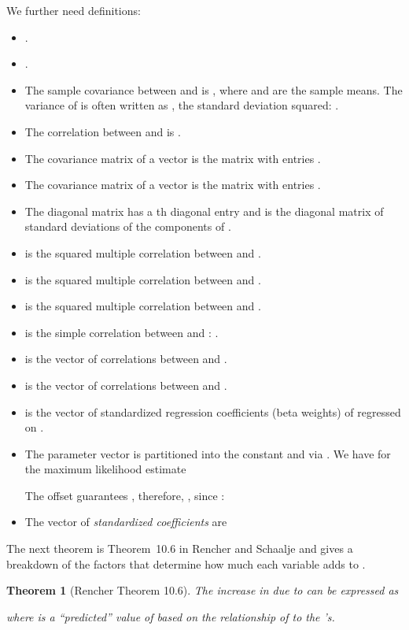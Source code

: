 \documentclass{article}
\newtheorem{theorem}{Theorem}
\begin{document}
\begin{appendices}
We further need definitions: 
\begin{itemize}
\item .
\item .
\item The sample covariance between  and 
  is , where
   and  are the sample means. The variance of  is  often
  written as , the standard deviation squared: .
\item The correlation between  and  is .
\item The covariance matrix  of a vector  is the matrix
  with entries .
\item The covariance matrix  of a vector  is the matrix
  with entries .
\item The diagonal matrix 
  has a th diagonal entry
   and is the diagonal matrix of standard deviations of the components
  of .
\item  is the squared multiple correlation between  and .
\item  is the squared multiple correlation between  and .
\item   is
  the squared multiple correlation between  and .
\item  is the simple correlation between  and : .
\item  is
  the vector of correlations between  and .
\item  is
  the vector of correlations between  and .
\item  is
  the vector of standardized regression coefficients (beta weights)
of  regressed on .
\item The parameter vector is partitioned into the constant 
  and  via
  .
  We have for the maximum likelihood estimate
 
 The offset  guarantees ,
 therefore, ,
 since :
 

 
\item The vector of {\em standardized coefficients}  are
 
\end{itemize}


The next theorem is Theorem~10.6 in Rencher and Schaalje \cite{Rencher:08}
and gives a breakdown of the factors that determine how much
each variable adds to  \cite[Chapter 10.6, p.~263]{Rencher:08}.
\begin{theorem}[Rencher Theorem 10.6]
The increase in  due to  can be expressed as

where 
is a ``predicted'' value of  based on the relationship of  to
the 's.
\end{theorem}


\end{appendices}
\end{document}
